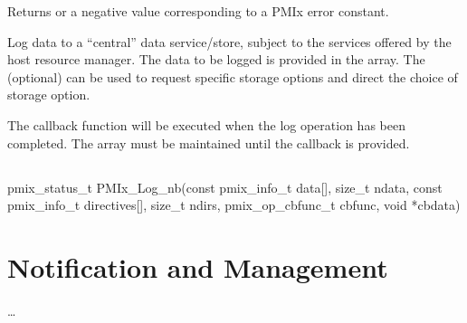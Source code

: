 \begin{arglist}
\end{arglist}

Returns  or a negative value corresponding to a PMIx error constant.

\descr

Log data to a ``central'' data service/store, subject to the services offered by the host resource manager.
The data to be logged is provided in the  array.
The (optional)  can be used to request specific storage options and direct the choice of storage option.

The callback function will be executed when the log operation has been completed.
The  array must be maintained until the callback is provided.


\subsection{}

\cspecificstart
\begin{codepar}
pmix_status_t
PMIx_Log_nb(const pmix_info_t data[], size_t ndata,
            const pmix_info_t directives[], size_t ndirs,
            pmix_op_cbfunc_t cbfunc, void *cbdata)
\end{codepar}
\cspecificend

\section{Notification and Management}
\label{chap:api_event:notify}

\ldots


\subsection{}

